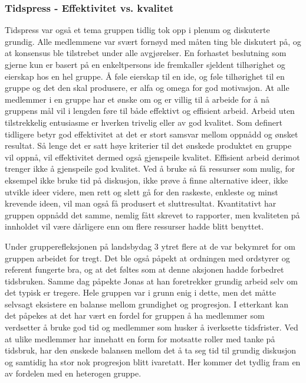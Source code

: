 \subsubsection{Tidspress - Effektivitet vs. kvalitet}
Tidspress var også et tema gruppen tidlig tok opp i plenum og diskuterte grundig.
Alle medlemmene var svært fornøyd med måten ting ble diskutert på, og at konsensus ble tilstrebet under alle avgjørelser.
En forhastet beslutning som gjerne kun er basert på en enkeltpersons ide fremkaller sjeldent tilhørighet og eierskap hos en hel gruppe.
Å føle eierskap til en ide, og føle tilhørighet til en gruppe og det den skal produsere, er alfa og omega for god motivasjon.
At alle medlemmer i en gruppe har et ønske om og er villig til å arbeide for å nå gruppens mål vil i lengden føre til både effektivt og effisient arbeid.
Arbeid uten tilstrekkelig entusiasme er hverken trivelig eller av god kvalitet.
Som definert tidligere betyr god effektivitet at det er stort samsvar mellom oppnådd og ønsket resultat.
Så lenge det er satt høye kriterier til det ønskede produktet en gruppe vil oppnå, vil effektivitet dermed også gjenspeile kvalitet.
Effisient arbeid derimot trenger ikke å gjenspeile god kvalitet.
Ved å bruke så få ressurser som mulig, for eksempel ikke bruke tid på diskusjon, ikke prøve å finne alternative ideer, ikke utvikle ideer videre, men rett og slett gå for den raskeste, enkleste og minst krevende ideen, vil man også få produsert et sluttresultat.
Kvantitativt har gruppen oppnådd det samme, nemlig fått skrevet to rapporter, men kvaliteten på innholdet vil være dårligere enn om flere ressurser hadde blitt benyttet.

Under grupperefleksjonen på landsbydag 3 ytret flere at de var bekymret for om gruppen arbeidet for tregt.
Det ble også påpekt at ordningen med ordstyrer og referent fungerte bra, og at det føltes som at denne aksjonen hadde forbedret tidsbruken.
Samme dag påpekte Jonas at han foretrekker grundig arbeid selv om det typisk er tregere.
Hele gruppen var i grunn enig i dette, men det måtte selvsagt eksistere en balanse mellom grundighet og progresjon.
I etterkant kan det påpekes at det har vært en fordel for gruppen å ha medlemmer som verdsetter å bruke god tid og medlemmer som husker å iverksette tidsfrister.
Ved at ulike medlemmer har innehatt en form for motsatte roller med tanke på tidsbruk, har den ønskede balansen mellom det å ta seg tid til grundig diskusjon og samtidig ha stor nok progresjon blitt ivaretatt. 
Her kommer det tydlig fram en av fordelen med en heterogen gruppe.

